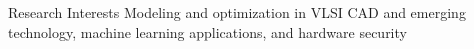 
\begin{rSection}{Research Interests}
    Modeling and optimization in VLSI CAD and emerging technology, machine learning applications, and hardware security 
\end{rSection}

